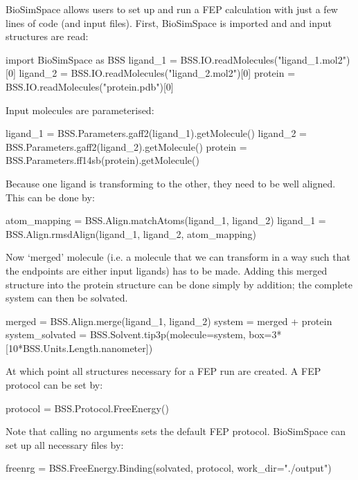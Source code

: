 BioSimSpace allows users to set up and run a FEP calculation with just a
few lines of code (and input files). First, BioSimSpace is imported and
and input structures are read:

\begin{python}
import BioSimSpace as BSS
ligand_1 = BSS.IO.readMolecules("ligand_1.mol2")[0]
ligand_2 = BSS.IO.readMolecules("ligand_2.mol2")[0]
protein = BSS.IO.readMolecules("protein.pdb")[0]
\end{python}

\noindent Input molecules are parameterised:

\begin{python}
ligand_1 = BSS.Parameters.gaff2(ligand_1).getMolecule()
ligand_2 = BSS.Parameters.gaff2(ligand_2).getMolecule()
protein = BSS.Parameters.ff14sb(protein).getMolecule()
\end{python}

\noindent Because one ligand is transforming to the other, they need to be
well aligned. This can be done by:

\begin{python}
atom_mapping = BSS.Align.matchAtoms(ligand_1, ligand_2)
ligand_1 = BSS.Align.rmsdAlign(ligand_1, ligand_2, 
                                     atom_mapping)
\end{python}

\noindent Now `merged' molecule (i.e. a molecule that we can
transform in a way such that the endpoints are either input ligands) has to be made. Adding this merged structure into the protein structure can be done simply by addition; the complete system can then be solvated.

\begin{python}
merged = BSS.Align.merge(ligand_1, ligand_2)
system = merged + protein
system_solvated = BSS.Solvent.tip3p(molecule=system, 
                box=3*[10*BSS.Units.Length.nanometer])
\end{python}

\noindent At which point all structures necessary for a FEP run are created. A FEP protocol can be set by:

\begin{python}
protocol = BSS.Protocol.FreeEnergy()
\end{python}

\noindent Note that calling no arguments sets the default FEP protocol. BioSimSpace can set up all necessary files by:

\begin{python}
freenrg = BSS.FreeEnergy.Binding(solvated, protocol, 
                                work_dir="./output")
\end{python}

